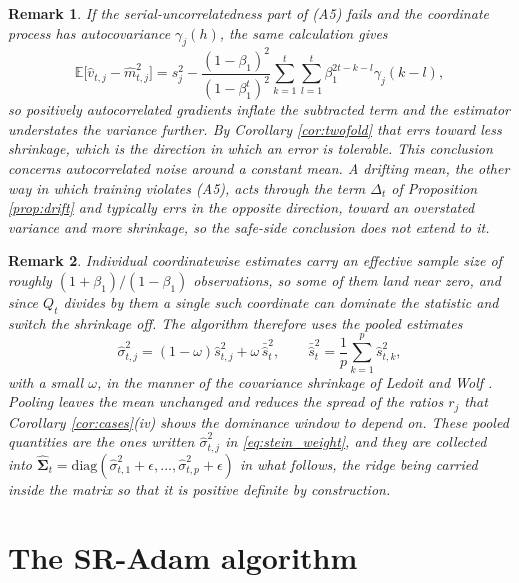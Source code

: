 \documentclass[pdflatex,sn-mathphys-num]{sn-jnl}%
\theoremstyle{thmstyleone}%
\theoremstyle{thmstyletwo}%
\newtheorem{remark}{Remark}%
\theoremstyle{thmstylethree}%
\newcommand{\rev}[1]{#1}
\newcommand{\diag}{\mathrm{diag}}
\newcommand{\E}{\mathbb{E}}
\begin{document}
\begin{remark}
\label{rem:a5}
If the serial-uncorrelatedness part of (A5) fails and the coordinate process has autocovariance $\gamma_j(h)$, the same calculation gives
\begin{equation}
\E\bigl[\hat v_{t,j}-\hat m^2_{t,j}\bigr]
=
s^2_j-\frac{(1-\beta_1)^2}{(1-\beta_1^{t})^{2}}\sum_{k=1}^{t}\sum_{l=1}^{t}\beta_1^{2t-k-l}\gamma_j(k-l),
\end{equation}
so positively autocorrelated gradients inflate the subtracted term and the estimator understates the variance further. By Corollary \ref{cor:twofold} that errs toward less shrinkage, which is the direction in which an error is tolerable. \rev{This conclusion concerns autocorrelated noise around a constant mean. A drifting mean, the other way in which training violates (A5), acts through the term $\Delta_t$ of Proposition \ref{prop:drift} and typically errs in the opposite direction, toward an overstated variance and more shrinkage, so the safe-side conclusion does not extend to it.}
\end{remark}

\begin{remark}
\label{rem:pooling}
Individual coordinatewise estimates carry an effective sample size of roughly $(1+\beta_1)/(1-\beta_1)$ observations, so some of them land near zero, and since $Q_t$ divides by them a single such coordinate can dominate the statistic and switch the shrinkage off. The algorithm therefore uses the pooled estimates
\begin{equation}
\label{eq:pooled}
\hat\sigma^2_{t,j}=(1-\omega)\hat s^2_{t,j}+\omega\,\bar{\hat s}^2_t,
\qquad
\bar{\hat s}^2_t=\frac1p\sum_{k=1}^{p}\hat s^2_{t,k},
\end{equation}
with a small $\omega$, in the manner of the covariance shrinkage of Ledoit and Wolf \cite{ledoit2004}. Pooling leaves the mean unchanged and reduces the spread of the ratios $r_j$ that Corollary \ref{cor:cases}(iv) shows the dominance window to depend on. These pooled quantities are the ones written $\hat\sigma^2_{t,j}$ in \eqref{eq:stein_weight}, and they are collected into $\widehat{\bm\Sigma}_t=\diag(\hat\sigma^2_{t,1}+\epsilon,\dots,\hat\sigma^2_{t,p}+\epsilon)$ in what follows, the ridge being carried inside the matrix so that it is positive definite by construction.
\end{remark}

\section{The SR-Adam algorithm}
\label{sec:algorithm}
\end{document}

